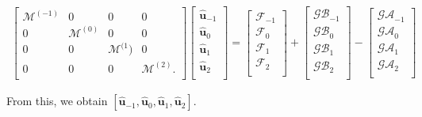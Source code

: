 \begin{eqnarray}
\begin{bmatrix}
    \mathcal{M}^{(-1)}& 0             & 0             & 0 \\
    0              & \mathcal{M}^{(0)}& 0             & 0 \\
    0              & 0              & \mathcal{M}^{(1}) & 0 \\
    0              & 0              & 0             & \mathcal{M}^{(2)}.  \\
\end{bmatrix}
\begin{bmatrix}
    \mathbf{\hat u}_{-1}\\
    \mathbf{\hat u}_{0}\\
    \mathbf{\hat u}_{1}\\
    \mathbf{\hat u}_{2}\\
\end{bmatrix}
=
\begin{bmatrix}
    \mathcal{F}_{-1}\\
    \mathcal{F}_{0}\\
    \mathcal{F}_{1}\\
    \mathcal{F}_{2}\\
\end{bmatrix}
+
\begin{bmatrix}
    \mathcal{GB}_{-1}\\
    \mathcal{GB}_{0}\\
    \mathcal{GB}_{1}\\
    \mathcal{GB}_{2}\\
\end{bmatrix}
-
\begin{bmatrix}
    \mathcal{GA}_{-1}\\
    \mathcal{GA}_{0}\\
    \mathcal{GA}_{1}\\
    \mathcal{GA}_{2}\\
\end{bmatrix}
\end{eqnarray}

From this, we obtain $\left[ \mathbf{\hat u}_{-1}, \mathbf{\hat u}_{0},\mathbf{\hat u}_{1},\mathbf{\hat u}_{2} \right]$.

